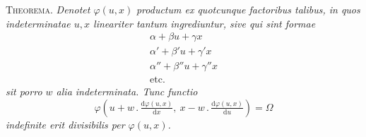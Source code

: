 \textsc{Theorema.} \textit{Denotet $\varphi(u,x)$}\textit{ productum ex quotcunque factoribus talibus, in
quos indeterminatae $u,x$ lineariter tantum ingrediuntur, sive qui sint formae}
\[
\begin{gathered}
\alpha+\beta u+\gamma x\\
\alpha'+\beta'u+\gamma'x\\
\alpha''+\beta''u+\gamma''x\\
\text{etc.}
\end{gathered}
\]
\textit{sit porro $w$ alia indeterminata. Tunc functio}
\[
\varphi(u+w\, .\,\tfrac{\mathrm d\varphi(u,x)}{\mathrm dx},\ x-w\, .\,\tfrac{\mathrm d\varphi(u,x)}{\mathrm du})=\Omega
\]
\textit{indefinite erit divisibilis per $\varphi(u,x)$.}



